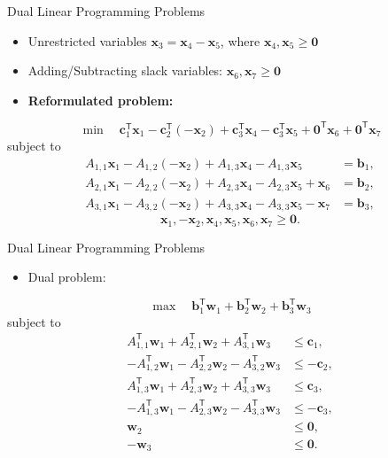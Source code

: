 \documentclass[aspectratio=169,hyperref,UTF8,CJK]{beamer}
\newcommand{\trans}{\mathsf{T}}
\newcommand{\vect}[1]{\boldsymbol{#1}}
\begin{document}
\begin{frame}{Dual Linear Programming Problems}
  \scriptsize
  \begin{itemize}
    \item Unrestricted variables $\vect{x}_3=\vect{x}_4-\vect{x}_5$, where $\vect{x}_4,\vect{x}_5\ge\vect{0}$
    \item Adding/Subtracting slack variables: $\vect{x}_6,\vect{x}_7\ge\vect{0}$
    \item \textbf{Reformulated problem:}
  \end{itemize}
  \begin{equation*}
    \min\quad \vect{c}_1^{\trans}\vect{x}_1-
    \vect{c}_2^{\trans}(-\vect{x}_2)+
    \vect{c}_3^{\trans}\vect{x}_4-
    \vect{c}_3^{\trans}\vect{x}_5+
    \vect{0}^{\trans}\vect{x}_6+\vect{0}^{\trans}\vect{x}_7
  \end{equation*}
  subject to
  \begin{align*}
    A_{1,1}\vect{x}_1-A_{1,2}(-\vect{x}_2)+A_{1,3}\vect{x}_4-A_{1,3}\vect{x}_5&=\vect{b}_1,\\
    A_{2,1}\vect{x}_1-A_{2,2}(-\vect{x}_2)+A_{2,3}\vect{x}_4-A_{2,3}\vect{x}_5+\vect{x}_6&=\vect{b}_2,\\
    A_{3,1}\vect{x}_1-A_{3,2}(-\vect{x}_2)+A_{3,3}\vect{x}_4-A_{3,3}\vect{x}_5-\vect{x}_7&=\vect{b}_3,
  \end{align*}
  \begin{equation*}
    \vect{x}_1,-\vect{x}_2,\vect{x}_4,\vect{x}_5,\vect{x}_6,\vect{x}_7\ge\vect{0}.
  \end{equation*}
\end{frame}

\begin{frame}{Dual Linear Programming Problems}
  \small
  \begin{itemize}
    \item Dual problem:
  \end{itemize}
  \begin{equation*}
    \max\quad \vect{b}_1^{\trans}\vect{w}_1+
    \vect{b}_2^{\trans}\vect{w}_2+
    \vect{b}_3^{\trans}\vect{w}_3
  \end{equation*}
  subject to
  \begin{align*}
    A_{1,1}^{\trans}\vect{w}_1+A_{2,1}^{\trans}\vect{w}_2+A_{3,1}^{\trans}\vect{w}_3&\le\vect{c}_1,\\
    -A_{1,2}^{\trans}\vect{w}_1-A_{2,2}^{\trans}\vect{w}_2-A_{3,2}^{\trans}\vect{w}_3&\le-\vect{c}_2,\\
    A_{1,3}^{\trans}\vect{w}_1+A_{2,3}^{\trans}\vect{w}_2+A_{3,3}^{\trans}\vect{w}_3&\le\vect{c}_3,\\
    -A_{1,3}^{\trans}\vect{w}_1-A_{2,3}^{\trans}\vect{w}_2-A_{3,3}^{\trans}\vect{w}_3&\le-\vect{c}_3,\\
    \vect{w}_2&\le\vect{0},\\
    -\vect{w}_3&\le\vect{0}.
  \end{align*}
\end{frame}
\end{document}
